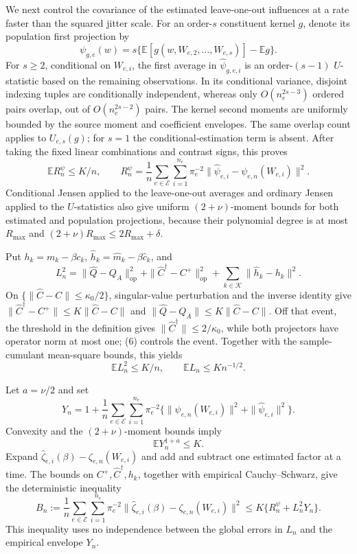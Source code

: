 We next control the covariance of the estimated leave-one-out influences at a rate faster than the squared jitter scale.  For an order-\(s\) constituent kernel \(g\), denote its population first projection by
\[
 \psi_{g,e}(w)=s\{\mathbb E[g(w,W_{e,2},\ldots,W_{e,s})]-\mathbb Eg\}.
\]
For \(s\geq2\), conditional on \(W_{e,i}\), the first average in \(\widehat\psi_{g,e,i}\) is an order-\((s-1)\) \(U\)-statistic based on the remaining observations.  In its conditional variance, disjoint indexing tuples are conditionally independent, whereas only \(O(n_e^{2s-3})\) ordered pairs overlap, out of \(O(n_e^{2s-2})\) pairs.  The kernel second moments are uniformly bounded by the source moment and coefficient envelopes.  The same overlap count applies to \(U_{e,s}(g)\); for \(s=1\) the conditional-estimation term is absent.  After taking the fixed linear combinations and contrast signs, this proves
\[
 \mathbb E R_n^\psi\leq K/n,
 \qquad
 R_n^\psi=\frac1n\sum_{e\in\mathcal E}\sum_{i=1}^{n_e}\pi_e^{-2}
 \|\widehat\psi_{e,i}-\psi_{e,n}(W_{e,i})\|^2. \tag{9}
\]
Conditional Jensen applied to the leave-one-out averages and ordinary Jensen applied to the \(U\)-statistics also give uniform \((2+\nu)\)-moment bounds for both estimated and population projections, because their polynomial degree is at most \(R_{\max}\) and
\((2+\nu)R_{\max}\leq2R_{\max}+\delta\).

Put \(h_k=m_k-\beta c_k\), \(\widehat h_k=\widehat m_k-\beta\widehat c_k\), and
\[
 L_n^2=\|\widehat Q-Q_A\|_{\mathrm{op}}^2
 +\|\widehat C^\dagger-C^+\|_{\mathrm{op}}^2
 +\sum_{k\in\mathcal K}\|\widehat h_k-h_k\|^2. \tag{10}
\]
On \(\{\|\widehat C-C\|\leq\kappa_0/2\}\), singular-value perturbation and the inverse identity give
\(\|\widehat C^\dagger-C^+\|\leq K\|\widehat C-C\|\) and
\(\|\widehat Q-Q_A\|\leq K\|\widehat C-C\|\).  Off that event, the threshold in the definition gives \(\|\widehat C^\dagger\|\leq2/\kappa_0\), while both projectors have operator norm at most one; (6) controls the event.  Together with the sample-cumulant mean-square bounds, this yields
\[
 \mathbb E L_n^2\leq K/n,
 \qquad
 \mathbb E L_n\leq K n^{-1/2}. \tag{11}
\]

Let \(a=\nu/2\) and set
\[
 Y_n=1+\frac1n\sum_{e\in\mathcal E}\sum_{i=1}^{n_e}\pi_e^{-2}
 \{\|\psi_{e,n}(W_{e,i})\|^2+\|\widehat\psi_{e,i}\|^2\}.
\]
Convexity and the \((2+\nu)\)-moment bounds imply
\[
 \mathbb E Y_n^{1+a}\leq K. \tag{12}
\]
Expand \(\widehat\zeta_{e,i}(\beta)-\zeta_{e,n}(W_{e,i})\) and add and subtract one estimated factor at a time.  The bounds on \(C^+,\widehat C^\dagger,h_k\), together with empirical Cauchy--Schwarz, give the deterministic inequality
\[
 B_n:=\frac1n\sum_{e\in\mathcal E}\sum_{i=1}^{n_e}\pi_e^{-2}
 \|\widehat\zeta_{e,i}(\beta)-\zeta_{e,n}(W_{e,i})\|^2
 \leq K\{R_n^\psi+L_n^2Y_n\}. \tag{13}
\]
This inequality uses no independence between the global errors in \(L_n\) and the empirical envelope \(Y_n\).

